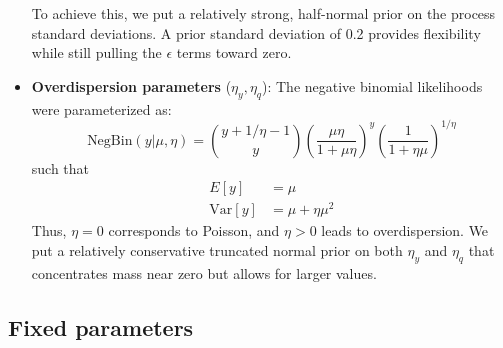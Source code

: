\documentclass[12pt,letterpaper]{article}
\begin{document}
\begin{itemize}
To achieve this, we put a relatively strong, half-normal prior on the process standard deviations.
A prior standard deviation of 0.2 provides flexibility while still pulling the $\epsilon$ terms toward zero.
\\
\item \textbf{Overdispersion parameters} ($\eta_y, \eta_q$): The negative binomial likelihoods were parameterized as:
\begin{equation}
\text{NegBin}(y | \mu, \eta) = {y + 1/\eta -1 \choose y}\left(\frac{\mu\eta}{1 + \mu\eta}\right)^y\left(\frac{1}{1+\eta\mu}\right)^{1/\eta}
\end{equation}
such that
\begin{align}
E[y] & = \mu\\
\text{Var}[y] &= \mu + \eta\mu^2
\end{align}
Thus, $\eta = 0$ corresponds to Poisson, and $\eta > 0$ leads to overdispersion.
We put a relatively conservative truncated normal prior on both $\eta_y$ and $\eta_q$ that concentrates mass near zero but allows for larger values.
\end{itemize}

\subsection*{Fixed parameters}
\end{document}
